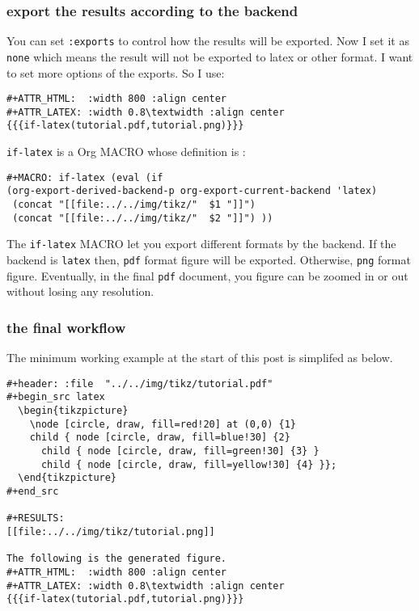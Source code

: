 \documentclass[koma,utopia,a4paper,captions=tableheading,11pt,listings-sv,microtype,paralist,colorlinks=true,urlcolor=blue]{org-article}
\begin{document}
\subsubsection{export the results according to the backend}
\label{sec:orgff78033}


You can set \texttt{:exports} to control how the results will be exported. Now I set it
as \texttt{none} which means the result will not be exported to latex or other format. I
want to set more options of the exports. So I use:

\begin{verbatim}
#+ATTR_HTML:  :width 800 :align center
#+ATTR_LATEX: :width 0.8\textwidth :align center
{{{if-latex(tutorial.pdf,tutorial.png)}}}
\end{verbatim}

\texttt{if-latex} is a Org MACRO whose definition is :
\begin{verbatim}
#+MACRO: if-latex (eval (if
(org-export-derived-backend-p org-export-current-backend 'latex)
 (concat "[[file:../../img/tikz/"  $1 "]]")
 (concat "[[file:../../img/tikz/"  $2 "]]") ))
\end{verbatim}

The \texttt{if-latex} MACRO let you export different formats by the backend. If the
backend is \texttt{latex} then, \texttt{pdf} format figure will be exported. Otherwise, \texttt{png} format
figure. Eventually, in the final \texttt{pdf} document, you figure can be zoomed in or
out without losing any resolution.

\subsubsection{the final workflow}
\label{sec:orga6d2484}


The minimum working example at the start of this post is simplifed as below.

\begin{verbatim}
#+header: :file  "../../img/tikz/tutorial.pdf"
#+begin_src latex
  \begin{tikzpicture}
    \node [circle, draw, fill=red!20] at (0,0) {1}
    child { node [circle, draw, fill=blue!30] {2}
      child { node [circle, draw, fill=green!30] {3} }
      child { node [circle, draw, fill=yellow!30] {4} }};
  \end{tikzpicture}
#+end_src

#+RESULTS:
[[file:../../img/tikz/tutorial.png]]

The following is the generated figure.
#+ATTR_HTML:  :width 800 :align center
#+ATTR_LATEX: :width 0.8\textwidth :align center
{{{if-latex(tutorial.pdf,tutorial.png)}}}
\end{verbatim}
\end{document}

